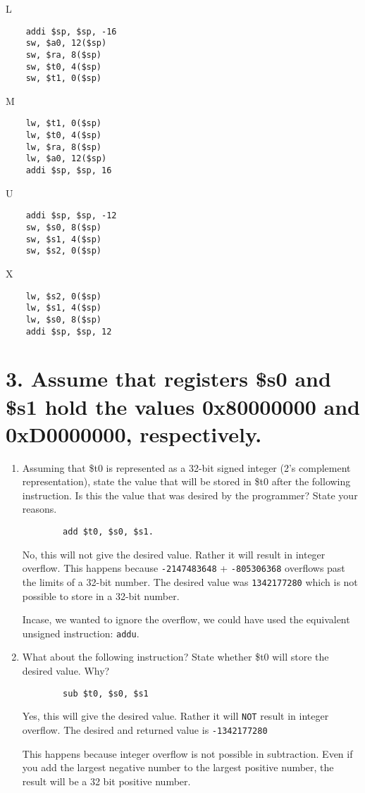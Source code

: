 \documentclass[11pt]{article}
\newenvironment{qparts}{\begin{enumerate}[{(}a{)}]}{\end{enumerate}}
\begin{document}
L
\begin{verbatim}
    addi $sp, $sp, -16
    sw, $a0, 12($sp)
    sw, $ra, 8($sp)
    sw, $t0, 4($sp)
    sw, $t1, 0($sp)
\end{verbatim}
M
\begin{verbatim}
    lw, $t1, 0($sp)
    lw, $t0, 4($sp)
    lw, $ra, 8($sp)
    lw, $a0, 12($sp)
    addi $sp, $sp, 16
\end{verbatim}
U
\begin{verbatim}
    addi $sp, $sp, -12
    sw, $s0, 8($sp)
    sw, $s1, 4($sp)
    sw, $s2, 0($sp)
\end{verbatim}
X
\begin{verbatim}
    lw, $s2, 0($sp)
    lw, $s1, 4($sp)
    lw, $s0, 8($sp)
    addi $sp, $sp, 12
\end{verbatim}

\newpage

\section*{3. Assume that registers \$s0 and \$s1 hold the values 0x80000000 and 0xD0000000, respectively.}

\begin{qparts}
    \item Assuming that \$t0 is represented as a 32-bit signed integer (2’s complement representation), state the value that will be stored in \$t0 after the following instruction. Is this the value that was desired by the programmer? State your reasons.
    \begin{verbatim}
        add $t0, $s0, $s1. 
    \end{verbatim}
    

    No, this will not give the desired value. Rather it will result in integer overflow. This happens because \texttt{-2147483648} + \texttt{-805306368} overflows past the limits of a 32-bit number. The desired value was \texttt{1342177280} which is not possible to store in a 32-bit number.

    Incase, we wanted to ignore the overflow, we could have used the equivalent unsigned instruction: \texttt{addu}.

    \item What about the following instruction? State whether \$t0 will store the desired value. Why?
    \begin{verbatim}
        sub $t0, $s0, $s1 
    \end{verbatim}

    Yes, this will give the desired value. Rather it will \texttt{NOT} result in integer overflow. The desired and returned value is \texttt{-1342177280} 

    This happens because integer overflow is not possible in subtraction. Even if you add the largest negative number to the largest positive number, the result will be a 32 bit positive number.

\end{qparts}
\end{document}
